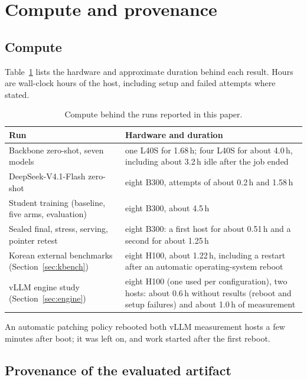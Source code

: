 \section{Compute and provenance}
\label{app:compute}

\subsection{Compute}

Table~\ref{tab:compute} lists the hardware and approximate duration behind each result. Hours
are wall-clock hours of the host, including setup and failed attempts where stated.

\begin{table}[h]
\centering
\small
\caption{Compute behind the runs reported in this paper.}
\label{tab:compute}
\begin{tabular}{@{}p{4.6cm}p{8.6cm}@{}}
\toprule
Run & Hardware and duration \\
\midrule
Backbone zero-shot, seven models & one L40S for 1.68\,h; four L40S for about 4.0\,h,
  including about 3.2\,h idle after the job ended \\
DeepSeek-V4.1-Flash zero-shot & eight B300, attempts of about 0.2\,h and 1.58\,h \\
Student training (baseline, five arms, evaluation) & eight B300, about 4.5\,h \\
Sealed final, stress, serving, pointer retest & eight B300: a first host for about 0.51\,h and
  a second for about 1.25\,h \\
Korean external benchmarks (Section~\ref{sec:kbench}) & eight H100, about 1.22\,h, including a
  restart after an automatic operating-system reboot \\
vLLM engine study (Section~\ref{sec:engine}) & eight H100 (one used per configuration), two
  hosts: about 0.6\,h without results (reboot and setup failures) and about 1.0\,h of
  measurement \\
\bottomrule
\end{tabular}
\end{table}

An automatic patching policy rebooted both vLLM measurement hosts a few minutes after boot; it
was left on, and work started after the first reboot.

\subsection{Provenance of the evaluated artifact}

